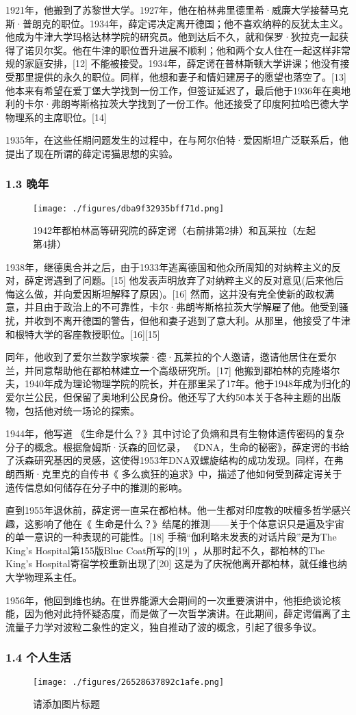 1921年，他搬到了苏黎世大学。1927年，他在柏林弗里德里希·威廉大学接替马克斯·普朗克的职位。1934年，薛定谔决定离开德国；他不喜欢纳粹的反犹太主义。他成为牛津大学玛格达林学院的研究员。他到达后不久，就和保罗·狄拉克一起获得了诺贝尔奖。他在牛津的职位晋升进展不顺利；他和两个女人住在一起这样非常规的家庭安排，[12] 不能被接受。1934年，薛定谔在普林斯顿大学讲课；他没有接受那里提供的永久的职位。同样，他想和妻子和情妇建房子的愿望也落空了。[13] 他本来有希望在爱丁堡大学找到一份工作，但签证延迟了，最后他于1936年在奥地利的卡尔·弗朗岑斯格拉茨大学找到了一份工作。他还接受了印度阿拉哈巴德大学物理系的主席职位。[14]

1935年，在这些任期问题发生的过程中，在与阿尔伯特·爱因斯坦广泛联系后，他提出了现在所谓的薛定谔猫思想的实验。

\subsubsection{1.3 晚年}
\begin{figure}[ht]
\centering
\texttt{[image: ./figures/dba9f32935bff71d.png]}
\caption{1942年都柏林高等研究院的薛定谔（右前排第2排）和瓦莱拉（左起第4排）} \label{fig_Erwin_2}
\end{figure}
1938年，继德奥合并之后，由于1933年逃离德国和他众所周知的对纳粹主义的反对，薛定谔遇到了问题。[15] 他发表声明放弃了对纳粹主义的反对意见(后来他后悔这么做，并向爱因斯坦解释了原因)。[16] 然而，这并没有完全使新的政权满意，并且由于政治上的不可靠性，卡尔·弗朗岑斯格拉茨大学解雇了他。他受到骚扰，并收到不离开德国的警告，但他和妻子逃到了意大利。从那里，他接受了牛津和根特大学的客座教授职位。[16][15]

同年，他收到了爱尔兰数学家埃蒙·德·瓦莱拉的个人邀请，邀请他居住在爱尔兰，并同意帮助他在都柏林建立一个高级研究所。[17] 他搬到都柏林的克隆塔尔夫，1940年成为理论物理学院的院长，并在那里呆了17年。他于1948年成为归化的爱尔兰公民，但保留了奥地利公民身份。他还写了大约50本关于各种主题的出版物，包括他对统一场论的探索。

1944年，他写道 《生命是什么？》其中讨论了负熵和具有生物体遗传密码的复杂分子的概念。根据詹姆斯·沃森的回忆录， 《DNA，生命的秘密》，薛定谔的书给了沃森研究基因的灵感，这使得1953年DNA双螺旋结构的成功发现。同样，在弗朗西斯·克里克的自传书《 多么疯狂的追求》中，描述了他如何受到薛定谔关于遗传信息如何储存在分子中的推测的影响。

直到1955年退休前，薛定谔一直呆在都柏林。他一生都对印度教的吠檀多哲学感兴趣，这影响了他在《 生命是什么？》结尾的推测——关于个体意识只是遍及宇宙的单一意识的一种表现的可能性。[18] 手稿“伽利略未发表的对话片段”是为The King's Hospital第155版Blue Coat所写的[19] ，从那时起不久，都柏林的The King's Hospital寄宿学校重新出现了[20] 这是为了庆祝他离开都柏林，就任维也纳大学物理系主任。

1956年，他回到维也纳。在世界能源大会期间的一次重要演讲中，他拒绝谈论核能，因为他对此持怀疑态度，而是做了一次哲学演讲。在此期间，薛定谔偏离了主流量子力学对波粒二象性的定义，独自推动了波的概念，引起了很多争议。

\subsubsection{1.4 个人生活}
\begin{figure}[ht]
\centering
\texttt{[image: ./figures/26528637892c1afe.png]}
\caption{请添加图片标题} \label{fig_Erwin_3}
\end{figure}
